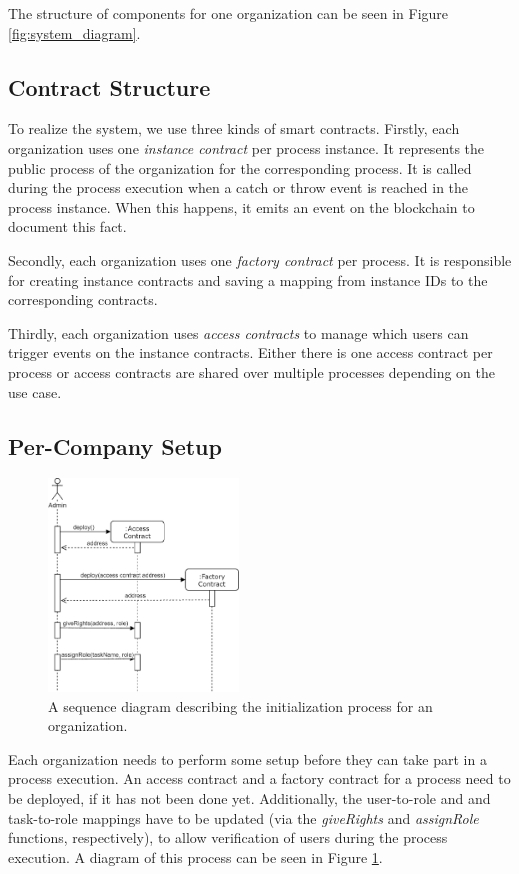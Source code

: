 \documentclass[runningheads]{llncs}
\begin{document}
The structure of components for one organization can be seen in Figure \ref{fig:system_diagram}.

\subsection{Contract Structure}
To realize the system, we use three kinds of smart contracts.
Firstly, each organization uses one \emph{instance contract} per process instance.
It represents the public process of the organization for the corresponding process.
It is called during the process execution when a catch or throw event is reached in the process instance.
When this happens, it emits an event on the blockchain to document this fact.

Secondly, each organization uses one \emph{factory contract} per process.
It is responsible for creating instance contracts and saving a mapping from instance IDs to the corresponding contracts.

Thirdly, each organization uses \emph{access contracts} to manage which users can trigger events on the instance contracts.
Either there is one access contract per process or access contracts are shared over multiple processes depending on the use case.

\subsection{Per-Company Setup}
\begin{figure}
	\centering
	\includegraphics[width=0.45\textwidth]{fig/initialization.eps}
	\caption{A sequence diagram describing the initialization process for an organization.}
	\label{fig:initialization}
\end{figure}

Each organization needs to perform some setup before they can take part in a process execution.
An access contract and a factory contract for a process need to be deployed, if it has not been done yet.
Additionally, the user-to-role and and task-to-role mappings have to be updated (via the \emph{giveRights} and \emph{assignRole} functions, respectively), to allow verification of users during the process execution.
A diagram of this process can be seen in Figure \ref{fig:initialization}.
\end{document}
